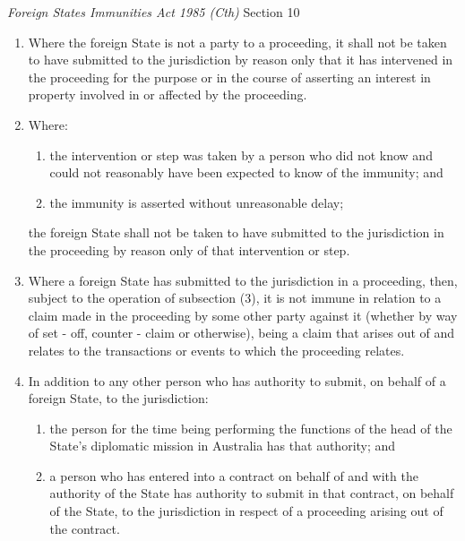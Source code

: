 \begin{statutedetails}{\textit{Foreign States Immunities Act 1985 (Cth)} Section 10}
\begin{enumerate}[label=(\arabic*)]
        \begin{enumerate}[label=(\alph*)]
            \item it has made an application for costs; or
            \item it has intervened, or has taken a step, in the proceeding for the purpose or in the course of asserting immunity.
        \end{enumerate}
        \item Where the foreign State is not a party to a proceeding, it shall not be taken to have submitted to the jurisdiction by reason only that it has intervened in the proceeding for the purpose or in the course of asserting an interest in property involved in or affected by the proceeding.
        \item Where:
        \begin{enumerate}[label=(\alph*)]
            \item the intervention or step was taken by a person who did not know and could not reasonably have been expected to know of the immunity; and
            \item the immunity is asserted without unreasonable delay;
        \end{enumerate}
        the foreign State shall not be taken to have submitted to the jurisdiction in the proceeding by reason only of that intervention or step.
        \item Where a foreign State has submitted to the jurisdiction in a proceeding, then, subject to the operation of subsection (3), it is not immune in relation to a claim made in the proceeding by some other party against it (whether by way of set - off, counter - claim or otherwise), being a claim that arises out of and relates to the transactions or events to which the proceeding relates.
        \item In addition to any other person who has authority to submit, on behalf of a foreign State, to the jurisdiction:
        \begin{enumerate}[label=(\alph*)]
            \item the person for the time being performing the functions of the head of the State's diplomatic mission in Australia has that authority; and
            \item a person who has entered into a contract on behalf of and with the authority of the State has authority to submit in that contract, on behalf of the State, to the jurisdiction in respect of a proceeding arising out of the contract.
        \end{enumerate}
    \end{enumerate}
\end{statutedetails}

